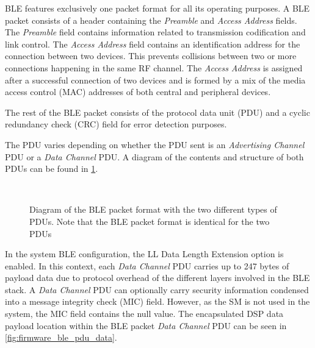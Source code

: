 BLE features exclusively one packet format for all its operating purposes. A BLE packet consists of a header containing the \textit{Preamble} and \textit{Access Address} fields. The \textit{Preamble} field contains information related to transmission codification and link control. The \textit{Access Address} field contains an identification address for the connection between two devices. This prevents collisions between two or more connections happening in the same RF channel. The \textit{Access Address} is assigned after a successful connection of two devices and is formed by a mix of the media access control (MAC) addresses of both central and peripheral devices.

The rest of the BLE packet consists of the protocol data unit (PDU) and a cyclic redundancy check (CRC) field for error detection purposes.

The PDU varies depending on whether the PDU sent is an \textit{Advertising Channel} PDU or a \textit{Data Channel} PDU. A diagram of the contents and structure of both PDUs can be found in \cref{fig:firmware_ble_pdu_structure}.

\begin{figure}[ht]
	\centering
	\\
	\caption{Diagram of the BLE packet format with the two different types of PDUs. Note that the BLE packet format is identical for the two PDUs \label{fig:firmware_ble_pdu_structure}}
\end{figure}

In the system BLE configuration, the LL Data Length Extension option is enabled. In this context, each \textit{Data Channel} PDU carries up to 247 bytes of payload data due to protocol overhead of the different layers involved in the BLE stack. A \textit{Data Channel} PDU can optionally carry security information condensed into a message integrity check (MIC) field. However, as the SM is not used in the system, the MIC field contains the null value. The encapsulated DSP data payload location within the BLE packet \textit{Data Channel} PDU can be seen in \cref{fig:firmware_ble_pdu_data}.

